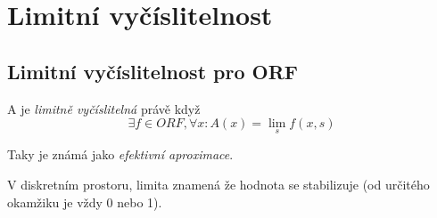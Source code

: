 \section{\texorpdfstring{Limitní vyčíslitelnost}{Limitní vyčíslitelnost}}
\vspace{5mm}
\large

\subsection{Limitní vyčíslitelnost pro ORF}

\begin{definition}
	A je \emph{limitně vyčíslitelná} právě když
	\[ \exists f \in ORF, \forall x: A(x) = \lim_s f(x, s) \]

	Taky je známá jako \emph{efektivní aproximace}.
\end{definition}

\begin{note}
	V diskretním prostoru, limita znamená že hodnota se stabilizuje (od určitého okamžiku je vždy 0 nebo 1).
\end{note}

